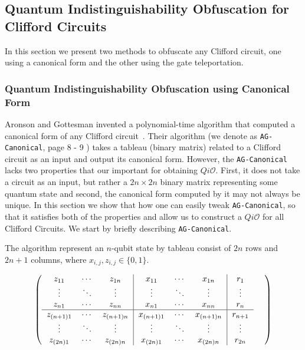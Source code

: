 \subsection{Quantum Indistinguishability Obfuscation for Clifford Circuits}
 In this section we present two methods to obfuscate any Clifford circuit,  one using a canonical form and the other using the gate teleportation.  

\subsubsection{Quantum Indistinguishability Obfuscation using  Canonical Form}
\label{sec:Clifford-iO-canonical}
Aronson and Gottesman invented a polynomial-time algorithm that computed a canonical form of any Clifford circuit~\cite{AG04}. Their algorithm (we denote as {\tt AG-Canonical}, page 8 - 9 \cite{AG04}) takes a tableau (binary matrix) related to a Clifford circuit as an input and output its canonical form.  However, the {\tt AG-Canonical} lacks two properties that our important for obtaining $Qi\mathcal{O}.$ First, it does not take a circuit as an input, but rather a $2n \times 2n$ binary matrix representing some quantum state and second, the canonical form computed by it may not always be unique. In this section we show that how one can easily tweak {\tt AG-Canonical}, so that it satisfies both of the properties and allow us to construct a  $Qi\mathcal{O}$ for all Clifford Circuits. We start by briefly describing  {\tt AG-Canonical}. 

The algorithm  represent an $n$-qubit state by tableau consist of $2n$ rows and $2n+1$ columns, where $x_{i,j} ,z_{i,j}\in \{0,1\}.$


\[
\left(
\begin{tabular}
[c]{ccc|ccc|c}%
$z_{11}$ & $\cdots$ & $z_{1n}$ & $x_{11}$ & $\cdots$ & $x_{1n}$ & $r_{1}$\\
$\vdots$ & $\ddots$ & $\vdots$ & $\vdots$ & $\ddots$ & $\vdots$ & $\vdots$\\
$z_{n1}$ & $\cdots$ & $z_{nn}$ & $x_{n1}$ & $\cdots$ & $x_{nn}$ & $r_{n}%
$\\\hline
$z_{\left(  n+1\right)  1}$ & $\cdots$ & $z_{\left(  n+1\right)  n}$ &
$x_{\left(  n+1\right)  1}$ & $\cdots$ & $x_{\left(  n+1\right)  n}$ &
$r_{n+1}$\\
$\vdots$ & $\ddots$ & $\vdots$ & $\vdots$ & $\ddots$ & $\vdots$ & $\vdots$\\
$z_{\left(  2n\right)  1}$ & $\cdots$ & $z_{\left(  2n\right)  n}$ &
$x_{\left(  2n\right)  1}$ & $\cdots$ & $x_{\left(  2n\right)  n}$ & $r_{2n}$%
\end{tabular}
\ \ \ \ \right)
\]

